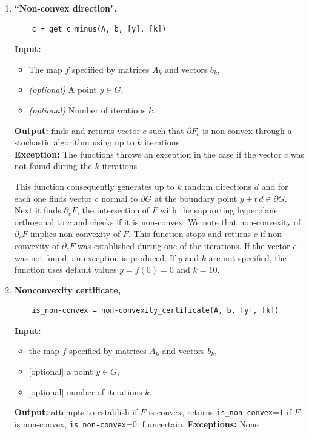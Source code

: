 \documentclass[a4paper]{article}
\theoremstyle{definition}
\begin{document}
\begin{enumerate}
\item {\bf ``Non-convex direction",\hskip 6pt} 
	\begin{verbatim}
	c = get_c_minus(A, b, [y], [k])
	\end{verbatim}
{\bf Input:}
\begin{itemize}
	\item The map $f$ specified by matrices $A_k$ and vectors $b_k$,
	\item {\it (optional)} A point $y\in G$,
	\item {\it (optional)} Number of iterations $k$.
\end{itemize}
{\bf Output:}  finds and returns vector $c$ such that $\partial F_c$ is non-convex through a stochastic algorithm using up to $k$ iterations\\
{\bf Exception:} The functions throws an exception in the case if the vector $c$ was not found during the $k$ iterations

This function consequently generates up to $k$ random directions $d$ and for each one finds vector $c$ normal to $\partial G$ at the boundary point $y+t\, d\in \partial G$.
Next it finds $\partial_c F$, the intersection of $F$ with the supporting hyperplane orthogonal to $c$ and checks if it is non-convex. 
We note that non-convexity of $\partial_c F$ implies non-convexity of $F$.
This function stops and returns $c$ if non-convexity of $\partial_c F$ was established during one of the iterations. If the vector $c$ was not found, an exception is produced.
If $y$ and $k$ are not specified, the function uses default values $y=f(0)=0$ and $k=10$.


\item {\bf Nonconvexity certificate,\hskip 6pt} 
	\begin{verbatim}
	is_non-convex = non-convexity_certificate(A, b, [y], [k])
	\end{verbatim}
{\bf Input:}
\begin{itemize}
	\item the map $f$ specified by matrices $A_k$ and vectors $b_k$,
	\item  $[$optional$]$ a point $y\in G$,
	\item $[$optional$]$ number of iterations $k$.
\end{itemize}
{\bf Output:} attempts to establish if $F$ is convex, returns {\tt is\_non-convex}=$1$ if $F$ is non-convex,  {\tt is\_non-convex}=$0$ if uncertain.
{\bf Exceptions:} None


\end{enumerate}
\end{document}
